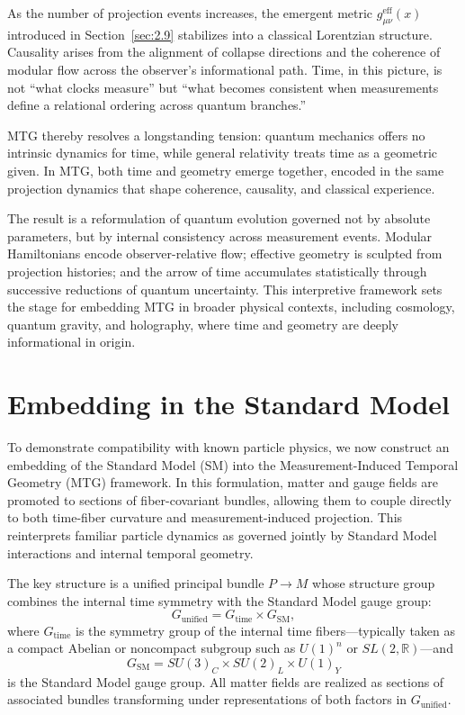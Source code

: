 \documentclass[11pt]{article}
\begin{document}
As the number of projection events increases, the emergent metric \( g^{\mathrm{eff}}_{\mu\nu}(x) \) introduced in Section~\ref{sec:2.9} stabilizes into a classical Lorentzian structure. Causality arises from the alignment of collapse directions and the coherence of modular flow across the observer’s informational path. Time, in this picture, is not ``what clocks measure'' but ``what becomes consistent when measurements define a relational ordering across quantum branches.''

MTG thereby resolves a longstanding tension: quantum mechanics offers no intrinsic dynamics for time, while general relativity treats time as a geometric given. In MTG, both time and geometry emerge together, encoded in the same projection dynamics that shape coherence, causality, and classical experience.

The result is a reformulation of quantum evolution governed not by absolute parameters, but by internal consistency across measurement events. Modular Hamiltonians encode observer-relative flow; effective geometry is sculpted from projection histories; and the arrow of time accumulates statistically through successive reductions of quantum uncertainty. This interpretive framework sets the stage for embedding MTG in broader physical contexts, including cosmology, quantum gravity, and holography, where time and geometry are deeply informational in origin.



\section{Embedding in the Standard Model}\label{sec:5}
To demonstrate compatibility with known particle physics, we now construct an embedding of the Standard Model (SM) into the Measurement-Induced Temporal Geometry (MTG) framework. In this formulation, matter and gauge fields are promoted to sections of fiber-covariant bundles, allowing them to couple directly to both time-fiber curvature and measurement-induced projection. This reinterprets familiar particle dynamics as governed jointly by Standard Model interactions and internal temporal geometry.

The key structure is a unified principal bundle \( P \to M \) whose structure group combines the internal time symmetry with the Standard Model gauge group:
\begin{equation}
G_{\mathrm{unified}} = G_{\mathrm{time}} \times G_{\mathrm{SM}},
\end{equation}
where \( G_{\mathrm{time}} \) is the symmetry group of the internal time fibers—typically taken as a compact Abelian or noncompact subgroup such as \( U(1)^n \) or \( SL(2,\mathbb{R}) \)—and
\begin{equation}
G_{\mathrm{SM}} = SU(3)_C \times SU(2)_L \times U(1)_Y
\end{equation}
is the Standard Model gauge group. All matter fields are realized as sections of associated bundles transforming under representations of both factors in \( G_{\mathrm{unified}} \).
\end{document}
